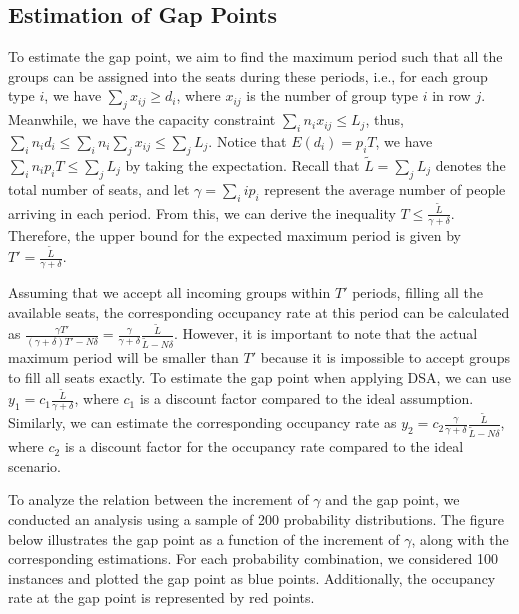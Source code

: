 \subsection{Estimation of Gap Points}
To estimate the gap point, we aim to find the maximum period such that all the groups can be assigned into the seats during these periods, i.e., for each group type $i$, we have $\sum_{j} x_{ij} \geq d_i$, where $x_{ij}$ is the number of group type $i$ in row $j$. Meanwhile, we have the capacity constraint $\sum_{i} n_{i} x_{ij} \leq L_j$, thus, $\sum_{i} n_i d_i \leq \sum_{i} n_i \sum_{j} x_{ij} \leq \sum_{j} L_{j}$. Notice that $E(d_i) = p_i T$, we have $\sum_{i} n_i p_i T \leq \sum_{j} L_{j}$ by taking the expectation. Recall that $\tilde{L} = \sum_{j} L_{j}$ denotes the total number of seats, and let $\gamma = \sum_{i} i p_i$ represent the average number of people arriving in each period. From this, we can derive the inequality $T \leq \frac{\tilde{L}}{\gamma + \delta}$. Therefore, the upper bound for the expected maximum period is given by $T' = \frac{\tilde{L}}{\gamma + \delta}$.


Assuming that we accept all incoming groups within $T'$ periods, filling all the available seats, the corresponding occupancy rate at this period can be calculated as $\frac{\gamma T'}{(\gamma+ \delta)T' - N \delta} = \frac{\gamma}{\gamma +\delta} \frac{\tilde{L}}{\tilde{L}-N \delta}$. However, it is important to note that the actual maximum period will be smaller than $T{'}$ because it is impossible to accept groups to fill all seats exactly. To estimate the gap point when applying DSA, we can use $y_1 = c_1 \frac{\tilde{L}}{\gamma + \delta}$, where $c_1$ is a discount factor compared to the ideal assumption. Similarly, we can estimate the corresponding occupancy rate as $y_2 = c_2 \frac{\gamma}{\gamma +\delta} \frac{\tilde{L}}{\tilde{L}-N \delta}$, where $c_2$ is a discount factor for the occupancy rate compared to the ideal scenario.

To analyze the relation between the increment of $\gamma$ and the gap point, we conducted an analysis using a sample of 200 probability distributions. The figure below illustrates the gap point as a function of the increment of $\gamma$, along with the corresponding estimations. For each probability combination, we considered 100 instances and plotted the gap point as blue points. Additionally, the occupancy rate at the gap point is represented by red points.


